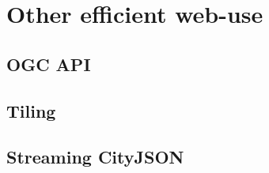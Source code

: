 \chapter{Other efficient web-use}
\label{chap:r2}

\section{OGC API}

\section{Tiling}

\section{Streaming CityJSON}